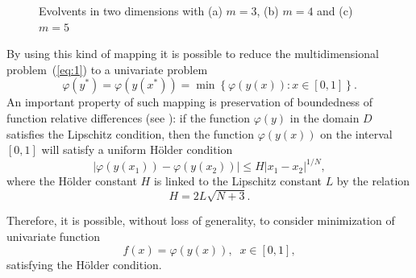 \documentclass{llncs}
\begin{document}
\begin{figure}
\begin{minipage}{0.32\linewidth}
\end{minipage}
\begin{minipage}{0.32\linewidth}
\end{minipage}
\caption{Evolvents in two dimensions with (a) $m=3$, (b) $m=4$ and (c) $m=5$}
\label{fig:0}
\end{figure}


By using this kind of mapping it is possible to reduce the multidimensional problem~(\ref{eq:1}) to a univariate problem
\[
\varphi(y^\ast)=\varphi(y(x^\ast))=\min{\left\{\varphi(y(x)): x\in[0,1]\right\}}.
\]
An important property of such mapping is preservation of boundedness of function relative differences  (see \cite{Strongin2000,Sergeyev2010}): if the function $\varphi(y)$ in the domain $D$ satisfies the Lipschitz condition, then the function $\varphi(y(x))$ on the interval $[0,1]$ will satisfy a uniform H{\"o}lder condition
\[
\left|\varphi(y(x_1))-\varphi(y(x_2))\right|\leq H\left|x_1-x_2\right|^{1/N},
\]
where the H{\"o}lder constant $H$ is linked to the Lipschitz constant $L$ by the relation
\[
H=2L\sqrt{N+3}.%
\]

Therefore, it is possible, without loss of generality, to consider minimization of univariate function
\[
f(x)=\varphi(y(x)), \;\; x\in[0,1],
\]
satisfying the H{\"o}lder condition.
\end{document}

